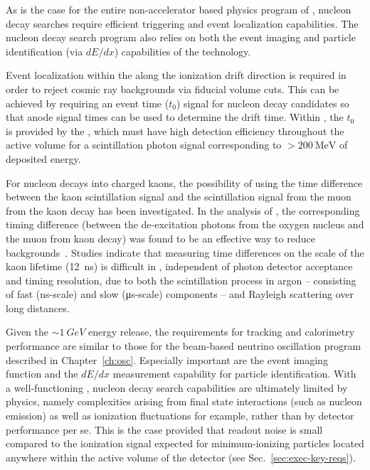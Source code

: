 As is the case for the entire  non-accelerator 
based physics program of , nucleon decay searches require 
efficient triggering and event localization  
capabilities. The nucleon decay search program also relies 
on both the event imaging and particle identification 
(via $dE/dx$) capabilities of the  technology.  

Event localization within the  along the ionization 
drift direction is required in order to reject cosmic ray 
backgrounds via fiducial volume cuts. This can be achieved by 
requiring an event time ($t_0$) signal for nucleon decay 
candidates so that  anode signal times can be used to 
determine the drift time.  Within , the $t_0$ is provided by 
the , which must have high detection 
efficiency throughout the  active volume for a 
scintillation photon signal corresponding to 
$>\SI{200}{\MeV}$ of deposited energy.

For nucleon decays into charged kaons, the possibility of using 
the time difference between the kaon scintillation signal and 
the scintillation signal from the muon from the kaon decay has 
been investigated.  
In the \superk analysis of \ptoknubar, the 
corresponding timing difference (between the de-excitation 
photons from the oxygen nucleus and the muon from kaon decay) 
was found to be an effective way to reduce
backgrounds~\cite{Abe:2014mwa}.  
Studies indicate that measuring time differences on the scale 
of the kaon lifetime (\SI{12}{\ns}) is difficult in , 
independent of photon detector acceptance and timing resolution, 
due to both the scintillation process in argon 
-- consisting of fast (\si{\ns}-scale) and slow (\si{\micro\second}-scale) components --  and 
Rayleigh scattering over long distances.

Given the $\sim \SI{1}{GeV}$ energy release, 
the requirements for tracking 
and calorimetry performance are similar to those for the 
beam-based neutrino oscillation program described 
in Chapter~\ref{ch:osc}.  Especially important are the 
event imaging function and the $dE/dx$ measurement 
capability for particle identification.   
With a well-functioning , nucleon decay search  
capabilities are ultimately limited by physics, namely
complexities arising from 
final state interactions (such as nucleon emission) 
as well as ionization fluctuations for example, 
rather than by detector performance per se. This is 
the case provided that readout noise is small compared to 
the ionization signal expected for minimum-ionizing particles
located anywhere within the active volume of the detector 
(see Sec.~\ref{sec:exec-key-reqs}).


